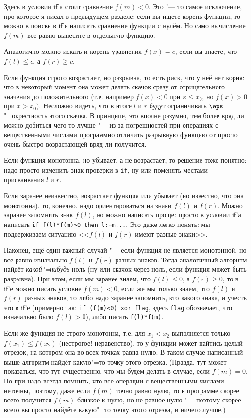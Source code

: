 Здесь в условии if'а стоит сравнение $f(m)<0$. 
Это "--- то самое исключение, про которое я писал в предыдущем разделе: если вы ищете корень функции, то можно в поиске в if'е написать
сравнение функции с нулём. Но само вычисление $f(m)$ все равно вынесите в отдельную функцию.

Аналогично можно искать и корень уравнения $f(x)=c$, если вы знаете, что $f(l)\leq c$, а $f(r)\geq c$.

Если функция строго возрастает, но разрывна, то есть риск, что у неё нет корня: что в некоторый момент она может делать скачок сразу от отрицательного
значения до положительного (т.е. например $f(x)<0$ при $x\leq x_0$, но $f(x)>0$ при $x>x_0$). 
Несложно видеть, что в итоге $l$ и $r$ будут ограничивать $\eps$"=окрестность этого скачка. 
В принципе, это вполне разумно, тем более вряд ли можно добиться чего-то лучше
"--- из-за погрешностей при операциях с вещественными числами программно отличить разрывную функцию от просто очень быстро возрастающей
вряд ли получится.

Если функция монотонна, но убывает, а не возрастает, то решение тоже понятно: надо просто изменить знак проверки в \verb`if`, ну или
поменять местами присваивания $l$ и $r$. 

Если заранее неизвестно, возрастает функция или убывает (но известно, что она монотонна), то, конечно, надо ориентироваться на знаки $f(l)$ и $f(r)$.
Можно заранее запомнить знак $f(l)$, но можно написать проще: просто в условии if'а написать \verb`if f(l)*f(m)>0 then l:=m...`.
Это даже легко понять: мы поддерживаем ситуацию <<$f(l)$ и $f(r)$ имеют разные знаки>>.

Наконец, ещё один важный случай "--- если функция не является монотонной, но все равно изначально $f(l)$ и $f(r)$ разных знаков. 
Тогда аналогичный алгоритм найдёт \textit{какой"=нибудь} ноль (ну или скачок через ноль, если функция может быть разрывна).
При этом, если мы заранее знаем, что $f(l)\leq 0$, а $f(r)\geq 0$, то в if'е можно писать условие $f(m)<0$, 
если же мы только знаем, что $f(l)$ и $f(r)$ разных знаков, то либо надо заранее запомнить, кто какого знака, 
и учесть это в if'е (примерно так: \verb`if (f(m)<0) xor flag`, здесь \verb`flag` обозначает, что изначально было $f(l)>0$), 
либо писать \verb`f(l)*f(m)`.

Если же функция не строго монотонна, т.е. для $x_1<x_2$ выполняется только $f(x_1)\leq f(x_2)$ 
(нестрогое! неравенство), то у функции может найтись целый отрезок, на котором она во всех точках равна нулю.
В таком случае написанный выше алгоритм найдёт какую"=то точку этого отрезка.
(Правда, тут может показаться, что тут существенно, что мы будем делать в случае, если $f(m)=0$. 
Но при надо всегда помнить, что все операции с вещественными числами неточны, поэтому, даже если $f(m)$ точно равно нулю,
то в программе скорее всего получится $f(m)$ близкое к нулю, но не равное нулю
"--- поэтому скорее всего вы просто найдёте какую"=то точку этого отрезка, и ничего лучше.)

